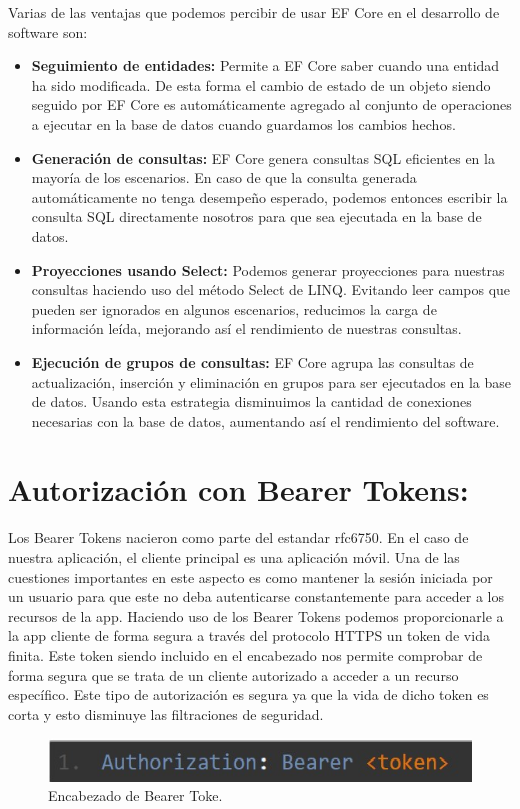 Varias de las ventajas que podemos percibir de usar EF Core en el desarrollo de software son:

\begin{itemize}
	\item \textbf{Seguimiento de entidades:} Permite a EF Core saber cuando una entidad ha sido modificada. De esta forma el cambio de estado de un objeto siendo seguido por EF Core es automáticamente agregado al conjunto de operaciones a ejecutar en la base de datos cuando guardamos los cambios hechos.
    \item \textbf{Generación de consultas:} EF Core genera consultas SQL eficientes en la mayoría de los escenarios. En caso de que la consulta generada automáticamente no tenga desempeño esperado, podemos entonces escribir la consulta SQL directamente nosotros para que sea ejecutada en la base de datos.
    \item \textbf{Proyecciones usando Select:} Podemos generar proyecciones para nuestras consultas haciendo uso del método Select de LINQ. Evitando leer campos que pueden ser ignorados en algunos escenarios, reducimos la carga de información leída, mejorando así el rendimiento de nuestras consultas.
    \item \textbf{Ejecución de grupos de consultas:} EF Core agrupa las consultas de actualización, inserción y eliminación en grupos para ser ejecutados en la base de datos. Usando esta estrategia disminuimos la cantidad de conexiones necesarias con la base de datos, aumentando así el rendimiento del software.
    
\end{itemize}

\section{Autorización con Bearer Tokens:}
Los Bearer Tokens nacieron como parte del estandar rfc6750.  En el caso de nuestra aplicación, el cliente principal es una aplicación móvil. Una de las cuestiones importantes en este aspecto es como mantener la sesión iniciada por un usuario para que este no deba autenticarse constantemente para acceder a los recursos de la app. Haciendo uso de los Bearer Tokens podemos proporcionarle a la app cliente de forma segura a través del protocolo HTTPS un token de vida finita. Este token siendo incluido en el encabezado nos permite comprobar de forma segura que se trata de un cliente autorizado a acceder a un recurso específico. Este tipo de autorización es segura ya que la vida de dicho token es corta y esto disminuye las filtraciones de seguridad.
\begin{figure}
	\centering
	\includegraphics[width = 14cm]{Graphics/bearer_token.jpg}
	\caption{Encabezado de Bearer Toke. }
	\label{fig:bearer_tokne}
\end{figure}

